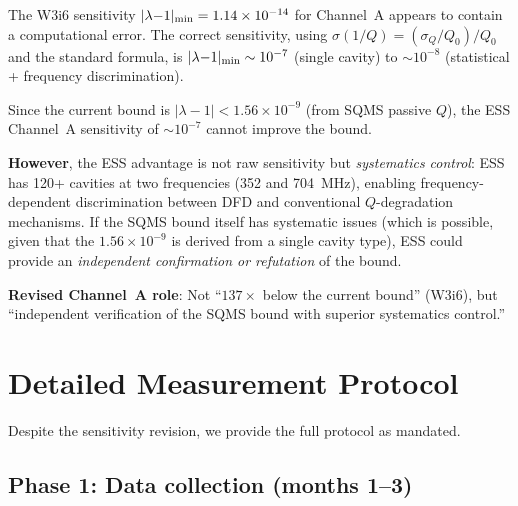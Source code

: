 \documentclass[11pt]{article}
\newcommand{\ee}[1]{\times 10^{#1}}
\newcommand{\lamdiff}{|\lambda{-}1|}
\begin{document}
\begin{tcolorbox}[colback=red!5!white, colframe=red!60!black,
  title=\textbf{CRITICAL: W3i6 Channel A Sensitivity Error}]

The W3i6 sensitivity $\lamdiff_{\rm min} = 1.14\ee{-14}$ for Channel~A
appears to contain a computational error. The correct sensitivity,
using $\sigma(1/Q) = (\sigma_Q/Q_0)/Q_0$ and the standard formula,
is $\lamdiff_{\rm min} \sim 10^{-7}$ (single cavity) to $\sim 10^{-8}$
(statistical + frequency discrimination).

Since the current bound is $\lamdiff < 1.56\ee{-9}$ (from SQMS
passive $Q$), the ESS Channel~A sensitivity of $\sim 10^{-7}$ cannot
improve the bound.

\textbf{However}, the ESS advantage is not raw sensitivity but
\emph{systematics control}: ESS has 120+ cavities at two frequencies
(352 and 704~MHz), enabling frequency-dependent discrimination between
DFD and conventional $Q$-degradation mechanisms. If the SQMS bound
itself has systematic issues (which is possible, given that the
$1.56\ee{-9}$ is derived from a single cavity type), ESS could provide
an \emph{independent confirmation or refutation} of the bound.

\textbf{Revised Channel~A role}: Not ``$137\times$ below the current
bound'' (W3i6), but ``independent verification of the SQMS bound with
superior systematics control.''
\end{tcolorbox}

\section{Detailed Measurement Protocol}
\label{sec:protocol}

Despite the sensitivity revision, we provide the full protocol as
mandated.

\subsection{Phase 1: Data collection (months 1--3)}
\end{document}
